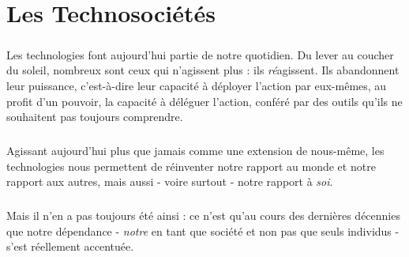\chapter{Les Technosociétés}

\paragraph{} Les technologies font aujourd'hui partie de notre quotidien. Du lever au coucher du soleil, nombreux sont
ceux qui n'agissent plus : ils \emph{ré}agissent. Ils abandonnent leur puissance, c'est-à-dire leur capacité à déployer
l'action par eux-mêmes, au profit d'un pouvoir, la capacité à déléguer l'action, conféré par des outils qu'ils ne 
souhaitent pas toujours comprendre.

\paragraph{} Agissant aujourd'hui plus que jamais comme une extension de nous-même, les technologies nous permettent de
réinventer notre rapport au monde et notre rapport aux autres, mais aussi - voire surtout - notre rapport à \emph{soi}.
\cite{Damasio2}

\paragraph{} Mais il n'en a pas toujours été ainsi : ce n'est qu'au cours des dernières décennies que notre dépendance
- \emph{notre} en tant que société et non pas que seuls individus - s'est réellement accentuée.



 
